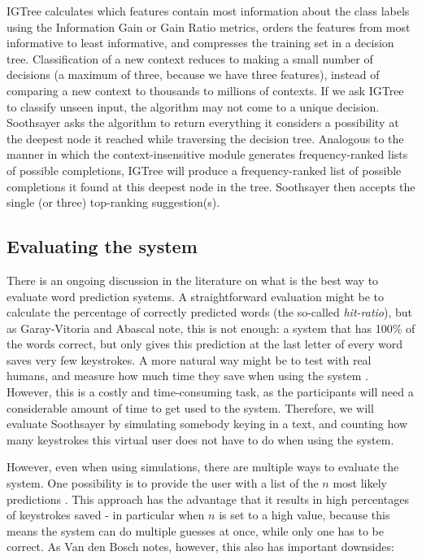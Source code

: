 \documentclass[11pt]{article}
\begin{document}
IGTree calculates which features contain most information about the class labels using the Information Gain or Gain Ratio metrics, orders the features from most informative to least informative, and compresses the training set in a decision tree. Classification of a new context reduces to making a small number of decisions (a maximum of three, because we have three features), instead of comparing a new context to thousands to millions of contexts. If we ask IGTree to classify unseen input, the algorithm may not come to a unique decision. Soothsayer asks the algorithm to return everything it considers a possibility at the deepest node it reached while traversing the decision tree. Analogous to the manner in which the context-insensitive module generates frequency-ranked lists of possible completions, IGTree will produce a frequency-ranked list of possible completions it found at this deepest node in the tree. Soothsayer then accepts the single (or three) top-ranking suggestion(s).

\subsection{Evaluating the system} \label{evaluation}

There is an ongoing discussion in the literature on what is the best way to evaluate word prediction systems. A straightforward evaluation might be to calculate the percentage of correctly predicted words (the so-called \emph{hit-ratio}), but as Garay-Vitoria and Abascal  note, this is not enough: a system that has 100\% of the words correct, but only gives this prediction at the last letter of every word saves very few keystrokes. A more natural way might be to test with real humans, and measure how much time they save when using the system \cite{carlberger+97,koester+98,Garay-Vitoria+06}. However, this is a costly and time-consuming task, as the participants will need a considerable amount of time to get used to the system. Therefore, we will evaluate Soothsayer by simulating somebody keying in a text, and counting how many keystrokes this virtual user does not have to do when using the system. 

However, even when using simulations, there are multiple ways to evaluate the system. One possibility is to provide the user with a list of the $n$ most likely predictions \cite{Lesher+99,Fazly+03}. This approach has the advantage that it results in high percentages of keystrokes saved - in particular when $n$ is set to a high value, because this means the system can do multiple guesses at once, while only one has to be correct. As Van den Bosch  notes, however, this also has important downsides: 
\end{document}
